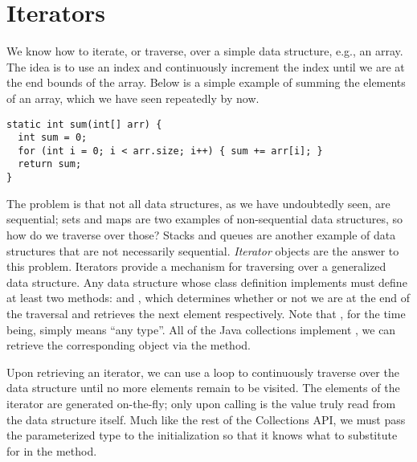 \section*{Iterators}
We know how to iterate, or traverse, over a simple data structure, e.g., an array. The idea is to use an index and continuously increment the index until we are at the end bounds of the array. Below is a simple example of summing the elements of an array, which we have seen repeatedly by now.

\begin{verbatim}
static int sum(int[] arr) {
  int sum = 0;
  for (int i = 0; i < arr.size; i++) { sum += arr[i]; }
  return sum;
}
\end{verbatim}

The problem is that not all data structures, as we have undoubtedly seen, are sequential; sets and maps are two examples of non-sequential data structures, so how do we traverse over those? Stacks and queues are another example of data structures that are not necessarily sequential. \textit{Iterator} objects are the answer to this problem. Iterators provide a mechanism for traversing over a generalized data structure. Any data structure whose class definition implements  must define at least two methods:  and , which determines whether or not we are at the end of the traversal and retrieves the next element respectively. Note that , for the time being, simply means ``any type''. All of the Java collections implement , we can retrieve the corresponding  object via the  method. 

Upon retrieving an iterator, we can use a  loop to continuously traverse over the data structure until no more elements remain to be visited. The elements of the iterator are generated on-the-fly; only upon calling  is the value truly read from the data structure itself. Much like the rest of the Collections API, we must pass the parameterized type to the  initialization so that it knows what to substitute for  in the  method.


